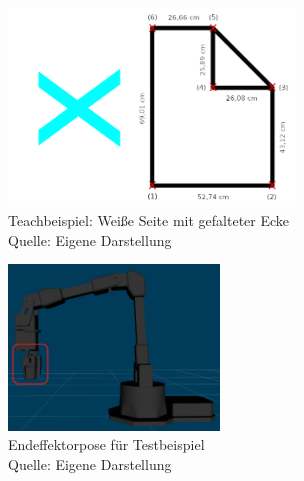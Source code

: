 \begin{figure}[htb]
	\centering
	\includegraphics[width=0.68\textwidth]{images/loesungsweg/white_page_with_folded_corner}
	\caption[Teachbeispiel: Weiße Seite mit gefalteter Ecke]{Teachbeispiel: Weiße Seite mit gefalteter Ecke\\Quelle: Eigene Darstellung}
	\label{fig:white_page_with_folded_corner}
\end{figure}
\FloatBarrier

\begin{figure}[htb]
	\centering
	\includegraphics[width=0.50\textwidth]{images/loesungsweg/endeffektor_pose_2}
	\caption[Endeffektorpose für Testbeispiel]{Endeffektorpose für Testbeispiel\\Quelle: Eigene Darstellung}
	\label{fig:endeffektor_pose}
\end{figure}
\FloatBarrier

